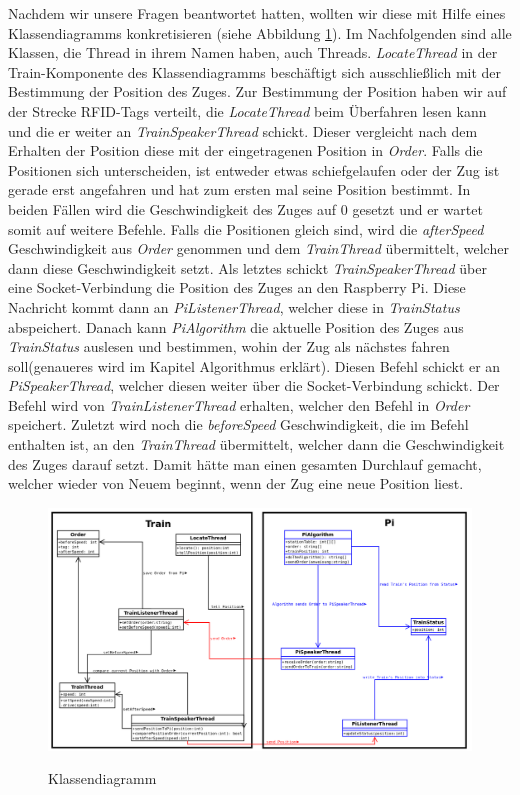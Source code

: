 Nachdem wir unsere Fragen beantwortet hatten, wollten wir diese mit Hilfe eines Klassendiagramms konkretisieren (siehe Abbildung \ref{pic:ClassDiagram}). Im Nachfolgenden sind alle Klassen, die Thread in ihrem Namen haben, auch Threads. \textit{LocateThread} in der Train-Komponente des Klassendiagramms beschäftigt sich ausschließlich mit der Bestimmung der Position des Zuges. Zur Bestimmung der Position haben wir auf der Strecke RFID-Tags verteilt, die \textit{LocateThread} beim Überfahren lesen kann und die er weiter an \textit{TrainSpeakerThread} schickt. Dieser vergleicht nach dem Erhalten der Position diese mit der eingetragenen Position in \textit{Order}. Falls die Positionen sich unterscheiden, ist entweder etwas schiefgelaufen oder der Zug ist gerade erst angefahren und hat zum ersten mal seine Position bestimmt. In beiden Fällen wird die Geschwindigkeit des Zuges auf 0 gesetzt und er wartet somit auf weitere Befehle. Falls die Positionen gleich sind, wird die \textit{afterSpeed} Geschwindigkeit aus \textit{Order} genommen und dem \textit{TrainThread} übermittelt, welcher dann diese Geschwindigkeit setzt. Als letztes schickt \textit{TrainSpeakerThread} über eine Socket-Verbindung die Position des Zuges an den Raspberry Pi. Diese Nachricht kommt dann an \textit{PiListenerThread}, welcher diese in \textit{TrainStatus} abspeichert. Danach kann \textit{PiAlgorithm} die aktuelle Position des Zuges aus \textit{TrainStatus} auslesen und bestimmen, wohin der Zug als nächstes fahren soll(genaueres wird im Kapitel Algorithmus erklärt). Diesen Befehl schickt er an \textit{PiSpeakerThread}, welcher diesen weiter über die Socket-Verbindung schickt. Der Befehl wird von \textit{TrainListenerThread} erhalten, welcher den Befehl in \textit{Order} speichert. Zuletzt wird noch die \textit{beforeSpeed} Geschwindigkeit, die im Befehl enthalten ist, an den \textit{TrainThread} übermittelt, welcher dann die Geschwindigkeit des Zuges darauf setzt. Damit hätte man einen gesamten Durchlauf gemacht, welcher wieder von Neuem beginnt, wenn der Zug eine neue Position liest.  


\begin{figure}[H]	
\caption{Klassendiagramm}
\includegraphics[width=2\textwidth, width=465pt]{content/images/ClassDiagram.png}
\label{pic:ClassDiagram}
\end{figure}



